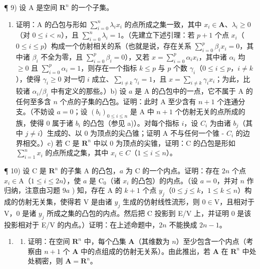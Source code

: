 ¶ 9) 设 A 是空间 \(\mathbf{R}^n\) 的一个子集。

\begin{enumerate}
\def\labelenumi{\alph{enumi})}
\tightlist
\item
  证明：A 的凸包与形如 \(\sum_{i=0}^{n} \lambda_i x_i\) 的点所成之集一致，其中 \(x_i \in \mathbf{A}\)、\(\lambda_i \geqslant 0\)（对 \(0 \leqslant i < n\)），且 \(\sum_{i=0}^{n} \lambda_i = 1\)。（先建立下述引理：若 \(p + 1\) 个点 \(x_i\)（\(0 \leqslant i \leqslant p\)）构成一个仿射相关的系（也就是说，存在关系 \(\sum_{i=0}^{p} \beta_i x_i = 0\)，其中诸 \(\beta_i\) 不全为零，且 \(\sum_{i=0}^{p} \beta_i = 0\)），又若 \(x = \sum_{i=0}^{p} \alpha_i x_i\)，其中诸 \(\alpha_i\) 均 \(\geqslant 0\) 且 \(\sum_{i=0}^{p} \alpha_i = 1\)，则存在一个指标 \(k \leqslant p\) 与 \(p\) 个数 \(\gamma_i\)（\(0 \leqslant i \leqslant p\)，\(i \neq k\)），使得 \(\gamma_i \geqslant 0\) 对一切 \(i\) 成立、\(\sum_{i \neq k} \gamma_i = 1\)，且 \(x = \sum_{i \neq k} \gamma_i x_i\)；为此，比较诸 \(\alpha_i / \beta_i\) 中有定义的那些。）b) 设 \(a\) 是 A 的凸包中的一点，它不属于 A 的任何至多含 \(n\) 个点的子集的凸包。证明：此时 A 至少含有 \(n + 1\) 个连通分支。（不妨设 \(a = 0\)；设 \((b_i)_{0 \leqslant i \leqslant n}\) 是 A 中 \(n + 1\) 个仿射无关的点所成的族，使得 0 属于诸 \(b_i\) 的凸包（参见 a)）。对每个指标 \(i\)，设 \(C_i\) 为由诸 \(b_j\)（其中 \(j \neq i\)）生成的、以 0 为顶点的尖凸锥；证明 A 不与任何一个锥 - \(C_i\) 的边界相交。）c) 若 C 是 \(\mathbf{R}^n\) 中以 0 为顶点的尖锥，证明：C 的凸包是形如 \(\sum_{i=1}^{n} x_i\) 的点所成之集，其中 \(x_i \in C\)（\(1 \leqslant i \leqslant n\)）。
\end{enumerate}

¶ 10) 设 C 是 \(\mathbf{R}^n\) 的子集 A 的凸包，\(a\) 为 C 的一个内点。证明：存在 \(2n\) 个点 \(x_i \in \mathrm{A}\)（\(1 \leqslant i \leqslant 2n\)），使 \(a\) 是 \(\mathrm{C}_0\)（诸 \(x_i\) 的凸包）的内点。（设 \(a = 0\)，并对 \(n\) 作归纳，注意由习题 \(9a\) ) 知，存在 A 的 \(k + 1\) 个点 \(y_j\)（\(0 \leqslant j \leqslant k\)，\(1 \leqslant k \leqslant n\)）构成的仿射无关集，使得若 V 是由诸 \(y_j\) 生成的仿射线性流形，则 \(0 \in \mathrm{V}\)，且相对于 V，0 是诸 \(y_j\) 所成之集的凸包的内点。然后把 C 投影到 E/V 上，并证明 0 是该投影相对于 E/V 的内点。）证明：在上述命题中，\(2n\) 不能换成 \(2n - 1\)。

\begin{enumerate}
\def\labelenumi{\arabic{enumi})}
\setcounter{enumi}{10}
\tightlist
\item
  \begin{enumerate}
  \def\labelenumii{\alph{enumii})}
  \tightlist
  \item
    证明：在空间 \(\mathbf{R}^n\) 中，每个凸集 \(\mathbf{A}\)（其维数为 \(n\)）至少包含一个内点（考察由 \(n + 1\) 个 \(\mathbf{A}\) 中的点组成的仿射无关系）。由此推出，若 \(\mathbf{A}\) 在 \(\mathbf{R}^n\) 中处处稠密，则 \(\mathbf{A} = \mathbf{R}^n\)。
  \end{enumerate}
\end{enumerate}


